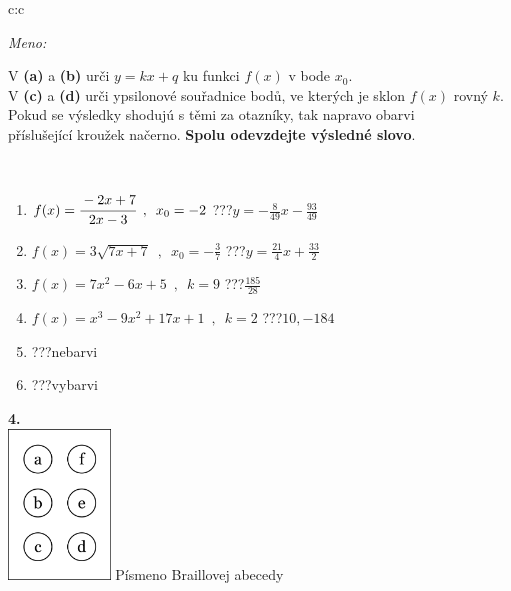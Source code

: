 \documentclass[10pt]{report}
\begin{document}
\begin{tabular}{c:c}
\begin{minipage}[c][104.5mm][t]{0.5\linewidth}
\begin{center}
\textit{Meno:}\phantom{xxxxxxxxxxxxxxxxxxxxxxxxxxxxxxxxxxxxxxxxxxxxxxxxxxxxxxxxxxxxxxxxx}\\[5mm]
\begin{minipage}{0.95\linewidth}
\begin{center}
V \textbf{(a)} a \textbf{(b)} urči  $y = kx + q$ ku funkci $f(x)$ v bode $x_0$.\\V \textbf{(c)} a \textbf{(d)} urči ypsilonové souřadnice bodů, ve kterých je sklon $f(x)$ rovný $k$.\\Pokud se výsledky shodujú s těmi za otazníky, tak napravo obarvi\\příslušející kroužek načerno. \textbf{Spolu odevzdejte výsledné slovo}.
\end{center}
\end{minipage}
\\[1mm]
\begin{minipage}{0.79\linewidth}
\begin{center}
\begin{varwidth}{\linewidth}
\begin{enumerate}
\small
\item $f(x)=\cfrac{-2x+7}{2x-3}\enspace , \enspace x_0=-2$\quad \dotfill\; ???\;\dotfill \quad $y = -\frac{8}{49}x-\frac{93}{49}$
\item $f(x)=3\sqrt{7x+7}\enspace , \enspace x_0=-\frac{3}{7}$\quad \dotfill\; ???\;\dotfill \quad $y = \frac{21}{4}x+\frac{33}{2}$
\item $f(x)=7x^2-6x+5\enspace , \enspace k=9$\quad \dotfill\; ???\;\dotfill \quad $\frac{185}{28}$
\item $f(x)=x^3-9x^2+17x+1\enspace , \enspace k=2$\quad \dotfill\; ???\;\dotfill \quad $10 , -184$
\item \quad \dotfill\; ???\;\dotfill \quad nebarvi
\item \quad \dotfill\; ???\;\dotfill \quad vybarvi
\end{enumerate}
\end{varwidth}
\end{center}
\end{minipage}
\begin{minipage}{0.20\linewidth}
\begin{center}
{\Huge\bfseries 4.} \\[2mm]
\includegraphics[height=40mm]{../images/braille.png}
{\small Písmeno Braillovej abecedy}
\end{center}
\end{minipage}
\end{center}
\end{minipage}
%
\end{tabular}
\end{document}
